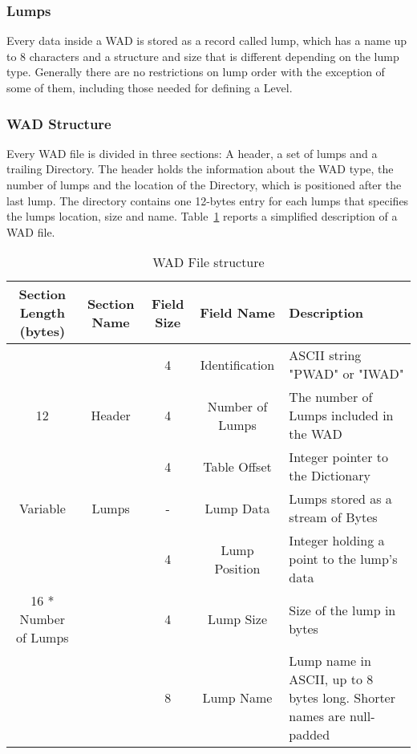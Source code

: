 \subsubsection{Lumps} Every data inside a \gls{WAD} is stored as a record called \gls{lump}, which has a name up to 8 characters and a structure and size that is different depending on the lump type. Generally there are no restrictions on lump order with the exception of some of them, including those needed for defining a Level.

\subsubsection{WAD Structure} Every \gls{WAD} file is divided in three sections: A header, a set of \glspl{lump} and a trailing Directory. The header holds the information about the WAD type, the number of \glspl{lump} and the location of the Directory, which is positioned after the last \gls{lump}. The directory contains one 12-bytes entry for each \glspl{lump} that specifies the \glspl{lump} location, size and name. Table~\ref{tab:WADStructure} reports a simplified description of a \gls{WAD} file.



\begin{table}[b]
	\centering
	\begin{tabularx}{\textwidth}{| c | c | c | c | X | }
		\hline
		Section Length (bytes) & Section Name & Field Size & Field Name & Description \\
		\hline
		   &   & 4 & Identification & ASCII string "PWAD" or "IWAD" \\ \cline{3-5}
		12 &     Header			  & 4 & Number of Lumps & The number of Lumps included in the WAD \\  \cline{3-5}
		&   						  & 4 & Table Offset & Integer pointer to the Dictionary \\ \cline{3-5}
		\hline
		Variable& Lumps & - & Lump Data & Lumps stored as a stream of Bytes \\
		\hline
		&                              & 4 & Lump Position & Integer holding a point to the lump's data \\ \cline{3-5}
		16 * Number of Lumps  & \multirow{3}{*}{}{Directory} & 4 & Lump Size & Size of the lump in bytes \\ \cline{3-5}
		&                              & 8 & Lump Name & Lump name in ASCII, up to 8 bytes long. Shorter names are null-padded \\ \cline{3-5}
		\hline
	\end{tabularx}
\caption{WAD File structure}
\label{tab:WADStructure}
\end{table}

